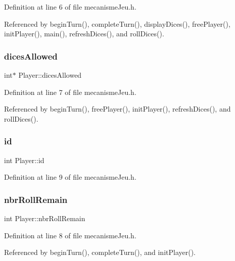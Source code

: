 Definition at line 6 of file mecanisme\+Jeu.\+h.



Referenced by begin\+Turn(), complete\+Turn(), display\+Dices(), free\+Player(), init\+Player(), main(), refresh\+Dices(), and roll\+Dices().

\mbox{\label{structPlayer_adb33524b9364f3e0bcfc5bd098cdaaf0}} 
\subsubsection{\texorpdfstring{dices\+Allowed}{dicesAllowed}}
{\footnotesize\ttfamily int$\ast$ Player\+::dices\+Allowed}



Definition at line 7 of file mecanisme\+Jeu.\+h.



Referenced by begin\+Turn(), free\+Player(), init\+Player(), refresh\+Dices(), and roll\+Dices().

\mbox{\label{structPlayer_a05e05f3a23de78da7ec032ec2bcf8c6c}} 
\subsubsection{\texorpdfstring{id}{id}}
{\footnotesize\ttfamily int Player\+::id}



Definition at line 9 of file mecanisme\+Jeu.\+h.

\mbox{\label{structPlayer_ae4c871b61a2af583a8b5975d736bea5d}} 
\subsubsection{\texorpdfstring{nbr\+Roll\+Remain}{nbrRollRemain}}
{\footnotesize\ttfamily int Player\+::nbr\+Roll\+Remain}



Definition at line 8 of file mecanisme\+Jeu.\+h.



Referenced by begin\+Turn(), complete\+Turn(), and init\+Player().

